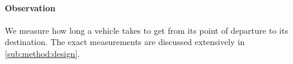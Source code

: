 
\paragraph{Observation} 
We measure how long a vehicle takes to get from its point of departure to its destination. The exact measurements are discussed extensively in \cref{sub:method:design}.


